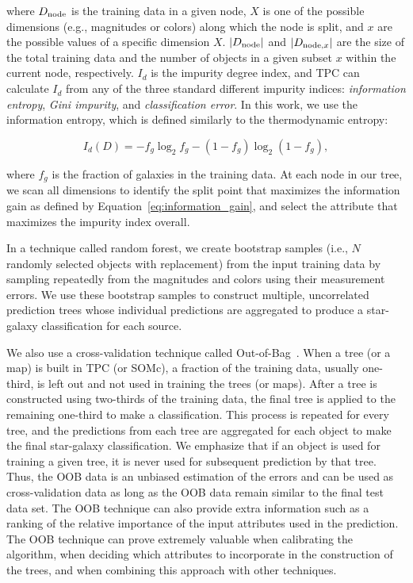 \documentclass[useAMS,usenatbib]{mn2e}
\newcommand{\eg}{{e.g., }}
\newcommand{\ie}{{i.e., }}
\begin{document}
\noindent
where $D_{{\mathrm{node}}}$ is the training data in a given node,
$X$ is one of the possible dimensions (\eg magnitudes or colors)
along which the node is split, and
$x$ are the possible values of a specific dimension $X$.
$|D_{{\mathrm{node}}}|$ and $|D_{{\mathrm{node}}, x}|$ are the size of the total training data
and the number of objects in a given subset $x$ within the current node,
respectively.
$I_d$ is the impurity degree index,
and TPC can calculate $I_d$
from any of the three standard different impurity indices:
\textit{information entropy}, \textit{Gini impurity},
and \textit{classification error}.
In this work, we use the information entropy,
which is defined similarly to the thermodynamic entropy:

\begin{equation}
  I_d \left( D \right)
  = - f_g \log_{2} f_g - \left(1 - f_g\right) \log_{2} \left(1 - f_g\right),
\end{equation}

\noindent
where $f_g$ is the fraction of galaxies in the training data.
At each node in our tree,
we scan all dimensions to identify the split point that
maximizes the information gain as defined by Equation~\ref{eq:information_gain},
and select the attribute that maximizes the impurity index overall.

In a technique called random forest,
we create bootstrap samples
(\ie $N$ randomly selected objects with replacement)
from the input training data
by sampling repeatedly from the magnitudes and colors
using their measurement errors.
We use these bootstrap samples to construct
multiple, uncorrelated prediction trees
whose individual predictions are aggregated to produce
a star-galaxy classification for each source.

We also use a cross-validation technique called
Out-of-Bag~\citep[OOB;][]{breiman1984classification, carrascokind2013tpz}.
When a tree (or a map) is built in TPC (or SOMc),
a fraction of the training data, usually one-third,
is left out and not used in training the trees (or maps).
After a tree is constructed using two-thirds of the training data,
the final tree is applied to the remaining one-third
to make a classification.
This process is repeated for every tree,
and the predictions from each tree are aggregated
for each object to make the final star-galaxy classification.
We emphasize that if an object is used for training a given tree,
it is never used for subsequent prediction by that tree.
Thus, the OOB data is an unbiased estimation of the errors
and can be used as cross-validation data
as long as the OOB data remain similar to the final test data set.
The OOB technique can also provide extra information such as
a ranking of the relative importance of the input attributes
used in the prediction.
The OOB technique can prove extremely valuable
when calibrating the algorithm,
when deciding which attributes to incorporate in the construction of the trees,
and when combining this approach with other techniques.
\end{document}
